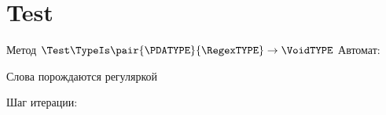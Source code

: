 \section{Test}
\begin{frame}{Метод $\Test\TypeIs\pair{\PDATYPE}{\RegexTYPE}\to\VoidTYPE$}
    Автомат:


    Слова порождаются регуляркой 

    Шаг итерации:



\end{frame}
